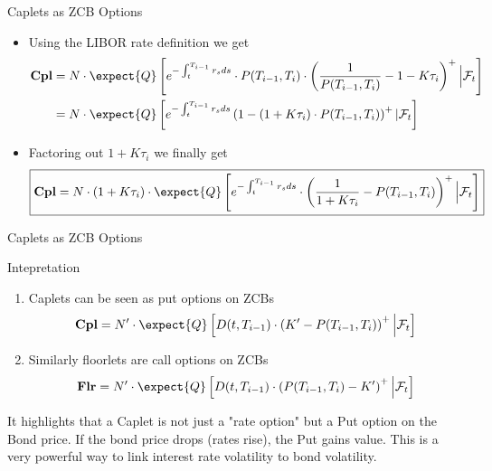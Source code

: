 \documentclass{beamer}
\begin{document}
\begin{frame}{Caplets as ZCB Options}
\begin{itemize}
\item<1-> Using the LIBOR rate definition we get
\begin{equation*}
	\begin{aligned}
		\textbf{Cpl} &=N\cdot\expect{Q}\left[e^{-\int_t^{T_{i-1}}r_s ds}\cdot P(T_{i-1},T_i)\cdot\left(\frac{1}{P(T_{i-1},T_i)}-1-K\tau_i\right)^+ \Big\rvert \mathcal{F}_t\right] \\
		& = N\cdot\expect{Q}\left[e^{-\int_t^{T_{i-1}}r_s ds}\left(1-(1+K\tau_i)\cdot P(T_{i-1},T_i)\right)^+ | \mathcal{F}_t\right]
	\end{aligned}
\end{equation*}
\item<2-> Factoring out $1+K\tau_i$ we finally get
\begin{equation}
	\boxed{\textbf{Cpl}=N\cdot(1+K\tau_i)\cdot\expect{Q}\left[e^{-\int_t^{T_{i-1}}r_s ds}\cdot\left(\frac{1}{1+K\tau_i}-P(T_{i-1},T_i)\right)^+ \Big\rvert \mathcal{F}_t\right]}
\end{equation}
\end{itemize}
\end{frame}

\begin{frame}{Caplets as ZCB Options}
\begin{block}{Intepretation}
\begin{enumerate}
	\item Caplets can be seen as \textcolor{maincolor}{put options} on ZCBs
	\begin{equation*}
		\textbf{Cpl}=N'\cdot\expect{Q}\left[D(t,T_{i-1})\cdot\left(K'-P(T_{i-1},T_i)\right)^+ \Big\rvert \mathcal{F}_t\right]
	\end{equation*}
	\item Similarly floorlets are \textcolor{maincolor}{call options} on ZCBs
	\begin{equation}
		\textbf{Flr}=N'\cdot\expect{Q}\left[D(t, T_{i-1})\cdot\left(P(T_{i-1},T_i)-K'\right)^+ \Big\rvert \mathcal{F}_t\right]
	\end{equation}
\end{enumerate}
\end{block}
It highlights that a Caplet is not just a "rate option" but a Put option on the Bond price. If the bond price drops (rates rise), the Put gains value. This is a very powerful way to link interest rate volatility to bond volatility.
\end{frame}
\end{document}
